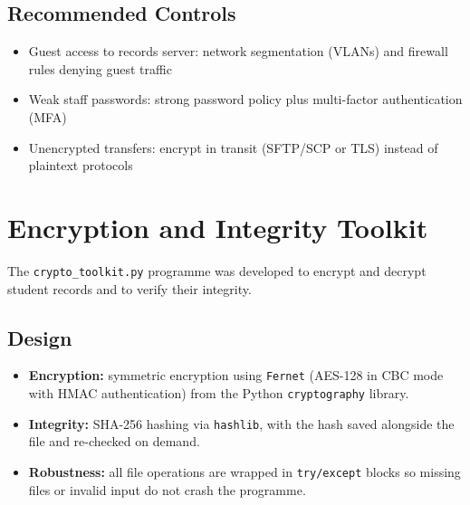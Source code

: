 \documentclass[11pt]{article}
\begin{document}
\subsection{Recommended Controls}
\begin{itemize}
  \item Guest access to records server: network segmentation (VLANs) and firewall rules denying guest traffic
  \item Weak staff passwords: strong password policy plus multi-factor authentication (MFA)
  \item Unencrypted transfers: encrypt in transit (SFTP/SCP or TLS) instead of plaintext protocols
\end{itemize}

\section{Encryption and Integrity Toolkit}
The \texttt{crypto\_toolkit.py} programme was developed to encrypt and decrypt student records and to verify their integrity.

\subsection{Design}
\begin{itemize}
  \item \textbf{Encryption:} symmetric encryption using \texttt{Fernet} (AES-128 in CBC mode with HMAC authentication) from the Python \texttt{cryptography} library.
  \item \textbf{Integrity:} SHA-256 hashing via \texttt{hashlib}, with the hash saved alongside the file and re-checked on demand.
  \item \textbf{Robustness:} all file operations are wrapped in \texttt{try/except} blocks so missing files or invalid input do not crash the programme.
\end{itemize}
\end{document}

